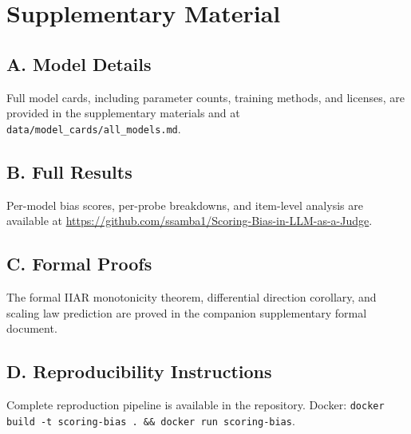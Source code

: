 \documentclass[11pt,preprint,nonatbib]{article}
\begin{document}



\appendix
\section*{Supplementary Material}

\subsection*{A. Model Details}
\label{app:models}
Full model cards, including parameter counts, training methods, and licenses, are provided in the supplementary materials and at \texttt{data/model\_cards/all\_models.md}.

\subsection*{B. Full Results}
\label{app:results}
Per-model bias scores, per-probe breakdowns, and item-level analysis are available at \url{https://github.com/ssamba1/Scoring-Bias-in-LLM-as-a-Judge}.

\subsection*{C. Formal Proofs}
\label{app:proofs}
The formal IIAR monotonicity theorem, differential direction corollary, and scaling law prediction are proved in the companion supplementary formal document.

\subsection*{D. Reproducibility Instructions}
\label{app:reproduce}
Complete reproduction pipeline is available in the repository. Docker: \texttt{docker build -t scoring-bias . \&\& docker run scoring-bias}.
\end{document}
